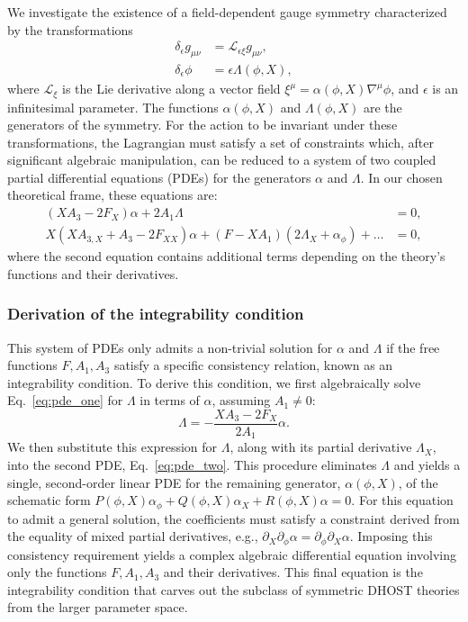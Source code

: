 \documentclass[twocolumn]{aastex631}
\begin{document}
We investigate the existence of a field-dependent gauge symmetry characterized by the transformations
\begin{align}
    \delta_\epsilon g_{\mu\nu} &= \mathcal{L}_{\epsilon \xi} g_{\mu\nu}, \\
    \delta_\epsilon \phi &= \epsilon \Lambda(\phi, X),
\end{align}
where $\mathcal{L}_{\xi}$ is the Lie derivative along a vector field $\xi^\mu = \alpha(\phi, X) \nabla^\mu \phi$, and $\epsilon$ is an infinitesimal parameter. The functions $\alpha(\phi, X)$ and $\Lambda(\phi, X)$ are the generators of the symmetry. For the action to be invariant under these transformations, the Lagrangian must satisfy a set of constraints which, after significant algebraic manipulation, can be reduced to a system of two coupled partial differential equations (PDEs) for the generators $\alpha$ and $\Lambda$. In our chosen theoretical frame, these equations are:
\begin{align}
    \left(X A_3 - 2 F_X\right) \alpha + 2 A_1 \Lambda &= 0, \label{eq:pde_one} \\
    X \left(X A_{3,X} + A_3 - 2 F_{XX}\right) \alpha + \left(F - X A_1 \right) \left(2 \Lambda_X + \alpha_\phi \right) + \dots &= 0, \label{eq:pde_two}
\end{align}
where the second equation contains additional terms depending on the theory's functions and their derivatives.

\subsubsection{Derivation of the integrability condition}
This system of PDEs only admits a non-trivial solution for $\alpha$ and $\Lambda$ if the free functions $F, A_1, A_3$ satisfy a specific consistency relation, known as an integrability condition. To derive this condition, we first algebraically solve Eq.~\eqref{eq:pde_one} for $\Lambda$ in terms of $\alpha$, assuming $A_1 \neq 0$:
\begin{equation}
    \Lambda = - \frac{X A_3 - 2 F_X}{2 A_1} \alpha.
\end{equation}
We then substitute this expression for $\Lambda$, along with its partial derivative $\Lambda_X$, into the second PDE, Eq.~\eqref{eq:pde_two}. This procedure eliminates $\Lambda$ and yields a single, second-order linear PDE for the remaining generator, $\alpha(\phi, X)$, of the schematic form $P(\phi,X) \alpha_\phi + Q(\phi,X) \alpha_X + R(\phi,X) \alpha = 0$. For this equation to admit a general solution, the coefficients must satisfy a constraint derived from the equality of mixed partial derivatives, e.g., $\partial_X \partial_\phi \alpha = \partial_\phi \partial_X \alpha$. Imposing this consistency requirement yields a complex algebraic differential equation involving only the functions $F, A_1, A_3$ and their derivatives. This final equation is the integrability condition that carves out the subclass of symmetric DHOST theories from the larger parameter space.
\end{document}
